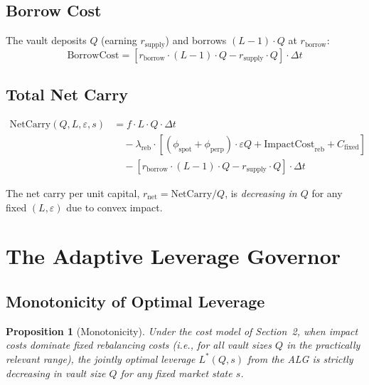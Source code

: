 \documentclass[11pt]{article}
\newtheorem{proposition}{Proposition}
\begin{document}
\subsection{Borrow Cost}

The vault deposits $Q$ (earning $r_{\text{supply}}$) and borrows $(L-1) \cdot Q$ at $r_{\text{borrow}}$:
\begin{equation}
\text{BorrowCost} = \left[ r_{\text{borrow}} \cdot (L-1) \cdot Q - r_{\text{supply}} \cdot Q \right] \cdot \Delta t
\end{equation}

\subsection{Total Net Carry}

\begin{align}
\text{NetCarry}(Q, L, \varepsilon, s) &= f \cdot L \cdot Q \cdot \Delta t \nonumber \\
&\quad - \lambda_{\text{reb}} \cdot \left[ (\phi_{\text{spot}} + \phi_{\text{perp}}) \cdot \varepsilon Q + \text{ImpactCost}_{\text{reb}} + C_{\text{fixed}} \right] \nonumber \\
&\quad - \left[ r_{\text{borrow}} \cdot (L-1) \cdot Q - r_{\text{supply}} \cdot Q \right] \cdot \Delta t
\end{align}

The net carry per unit capital, $r_{\text{net}} = \text{NetCarry} / Q$, is \textit{decreasing in $Q$} for any fixed $(L, \varepsilon)$ due to convex impact.

\section{The Adaptive Leverage Governor}

\subsection{Monotonicity of Optimal Leverage}

\begin{proposition}[Monotonicity]
Under the cost model of Section~2, when impact costs dominate fixed rebalancing costs (i.e., for all vault sizes $Q$ in the practically relevant range), the jointly optimal leverage $L^*(Q, s)$ from the ALG is strictly decreasing in vault size $Q$ for any fixed market state $s$.
\end{proposition}
\end{document}
